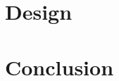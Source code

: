 \documentclass[10pt,twocolumn]{article}
\begin{document}
	
	\section{Design}
	
	
	\section{Conclusion}
	
	
	
	
	
	
\end{document}
